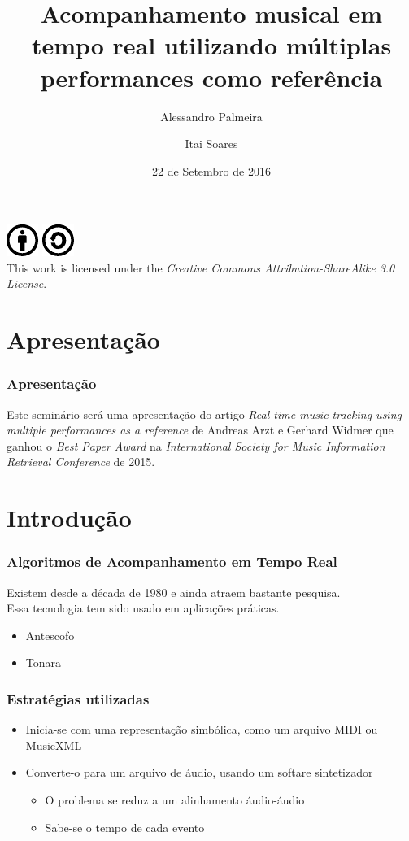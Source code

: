 \documentclass[serif,mathserif]{beamer}
\author[Alessandro Palmeira\\ \and Itai Soares]{Alessandro Palmeira\\ \and Itai Soares}
\title[Instituto de Matemática e Estatística - USP\hspace{2em}\insertframenumber/\inserttotalframenumber]{Acompanhamento musical em tempo real utilizando múltiplas performances como referência}
\date{22 de Setembro de 2016} %
\institute{MAC6917 Topics in Sound and Music Computing: Music Information Retrieval}
\newcommand{\CcImageBy}[1]{%
  \includegraphics[scale=#1]{src/img/creative_commons/cc_by_30.pdf}%
}
\newcommand{\CcImageSa}[1]{%
  \includegraphics[scale=#1]{src/img/creative_commons/cc_sa_30.pdf}%
}
\newcommand{\CcGroupBySa}[2]{%
  \CcImageBy{#1}\hspace*{#2}\CcImageSa{#1}%
}
\newcommand{\CcLongnameBySa}{Attribution-ShareAlike}
\newcommand{\CcNote}[1]{%
  This work is licensed under the \textit{Creative Commons #1 3.0 License}.%
}
\begin{document}
\begin{frame}
  \titlepage
  \begin{center}
    \CcGroupBySa{0.83}{0.95ex}\\
    {\tiny\CcNote{\CcLongnameBySa}}
  \end{center}
\end{frame}

\section{Apresentação}
\begin{frame}
  \frametitle{Apresentação}
  Este seminário será uma apresentação do artigo \emph{Real-time music tracking using multiple performances as a reference} de Andreas Arzt e Gerhard Widmer que ganhou o \emph{Best Paper Award} na  \emph{International Society for Music Information Retrieval Conference} de 2015.
\end{frame}

\section{Introdução}  %

\begin{frame}
  \frametitle{Algoritmos de Acompanhamento em Tempo Real}
  Existem desde a década de 1980 e ainda atraem bastante pesquisa.\pause\\
  Essa tecnologia tem sido usado em aplicações práticas.\pause
  \begin{itemize}
    \item Antescofo\\
    \item Tonara
  \end{itemize}
\end{frame}

\begin{frame}
  \frametitle{Estratégias utilizadas}
  \begin{itemize}
    \item Inicia-se com uma representação simbólica, como um arquivo MIDI ou MusicXML\\\pause
    \item Converte-o para um arquivo de áudio, usando um softare sintetizador\pause
      \begin{itemize}
        \item O problema se reduz a um alinhamento áudio-áudio\\\pause
        \item Sabe-se o tempo de cada evento\\
      \end{itemize}
  \end{itemize}
\end{frame}
\end{document}
